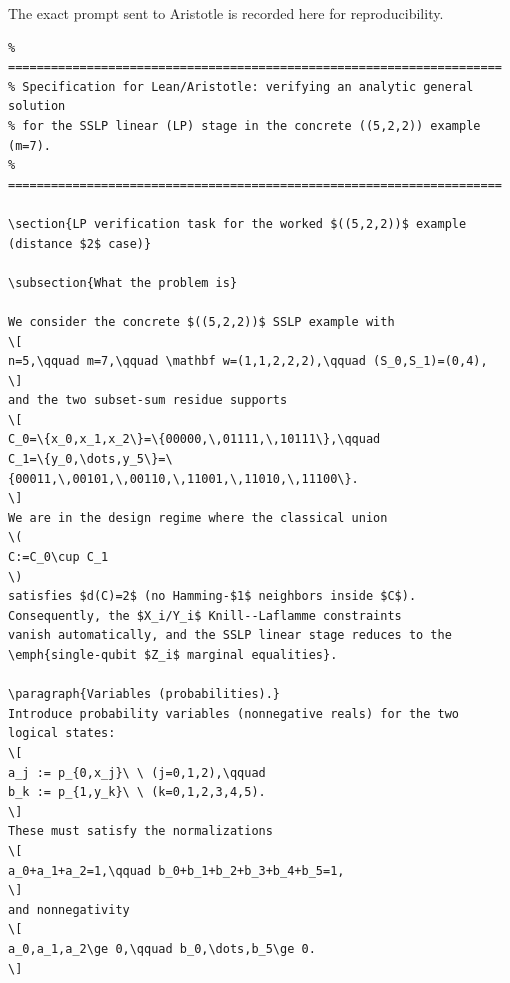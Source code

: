 \documentclass[11pt]{article}
\begin{document}
\noindent The exact prompt sent to Aristotle is recorded here for reproducibility.

\begin{verbatim}
% =====================================================================
% Specification for Lean/Aristotle: verifying an analytic general solution
% for the SSLP linear (LP) stage in the concrete ((5,2,2)) example (m=7).
% =====================================================================

\section{LP verification task for the worked $((5,2,2))$ example (distance $2$ case)}

\subsection{What the problem is}

We consider the concrete $((5,2,2))$ SSLP example with
\[
n=5,\qquad m=7,\qquad \mathbf w=(1,1,2,2,2),\qquad (S_0,S_1)=(0,4),
\]
and the two subset-sum residue supports
\[
C_0=\{x_0,x_1,x_2\}=\{00000,\,01111,\,10111\},\qquad
C_1=\{y_0,\dots,y_5\}=\{00011,\,00101,\,00110,\,11001,\,11010,\,11100\}.
\]
We are in the design regime where the classical union
\(
C:=C_0\cup C_1
\)
satisfies $d(C)=2$ (no Hamming-$1$ neighbors inside $C$). Consequently, the $X_i/Y_i$ Knill--Laflamme constraints
vanish automatically, and the SSLP linear stage reduces to the \emph{single-qubit $Z_i$ marginal equalities}.

\paragraph{Variables (probabilities).}
Introduce probability variables (nonnegative reals) for the two logical states:
\[
a_j := p_{0,x_j}\ \ (j=0,1,2),\qquad
b_k := p_{1,y_k}\ \ (k=0,1,2,3,4,5).
\]
These must satisfy the normalizations
\[
a_0+a_1+a_2=1,\qquad b_0+b_1+b_2+b_3+b_4+b_5=1,
\]
and nonnegativity
\[
a_0,a_1,a_2\ge 0,\qquad b_0,\dots,b_5\ge 0.
\]


\end{verbatim}
\end{document}
